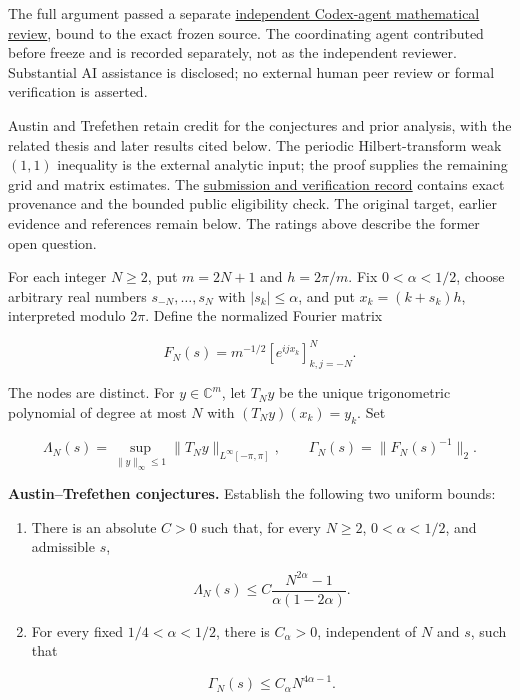 \documentclass[11pt,a4paper]{article}
\makeatletter
\renewcommand{\subsection}{\Needspace{4\baselineskip}\@startsection{subsection}{2}{0pt}{9pt plus 1pt minus 1pt}{3pt}{\sffamily\bfseries\normalsize\color{ink}}}
\makeatother
\begin{document}
The full argument passed a separate
\href{https://github.com/ajt60gaibb/OpenProblemsInNLA/blob/main/references/stepaniants-ie26-2026-09-12/verification/independent-review/IE-26-independent-review.md}{independent
Codex-agent mathematical review}, bound to the exact frozen source. The
coordinating agent contributed before freeze and is recorded separately,
not as the independent reviewer. Substantial AI assistance is disclosed;
no external human peer review or formal verification is asserted.

Austin and Trefethen retain credit for the conjectures and prior
analysis, with the related thesis and later results cited below. The
periodic Hilbert-transform weak \((1,1)\) inequality is the external
analytic input; the proof supplies the remaining grid and matrix
estimates. The
\href{https://github.com/ajt60gaibb/OpenProblemsInNLA/blob/main/references/stepaniants-ie26-2026-09-12/README.md}{submission
and verification record} contains exact provenance and the bounded
public eligibility check. The original target, earlier evidence and
references remain below. The ratings above describe the former open
question.

\newpage

\subsection{Statement}\label{statement}

For each integer \(N\ge2\), put \(m=2N+1\) and \(h=2\pi/m\). Fix
\(0<\alpha<1/2\), choose arbitrary real numbers \(s_{-N},\ldots,s_N\)
with \(|s_k|\le\alpha\), and put \(x_k=(k+s_k)h\), interpreted modulo
\(2\pi\). Define the normalized Fourier matrix

\[F_N(s)=m^{-1/2}[e^{ijx_k}]_{k,j=-N}^{N}.\]

The nodes are distinct. For \(y\in\mathbb C^m\), let \(T_Ny\) be the
unique trigonometric polynomial of degree at most \(N\) with
\((T_Ny)(x_k)=y_k\). Set

\[\Lambda_N(s)=\sup_{\|y\|_\infty\le1}\|T_Ny\|_{L^\infty[-\pi,\pi]},\qquad
\Gamma_N(s)=\|F_N(s)^{-1}\|_2.\]

\textbf{Austin--Trefethen conjectures.} Establish the following two
uniform bounds:

\begin{enumerate}
\def\labelenumi{\arabic{enumi}.}
\item
  There is an absolute \(C>0\) such that, for every \(N\ge2\),
  \(0<\alpha<1/2\), and admissible \(s\),

  \[\Lambda_N(s)\le C\frac{N^{2\alpha}-1}{\alpha(1-2\alpha)}.\]
\item
  For every fixed \(1/4<\alpha<1/2\), there is \(C_\alpha>0\),
  independent of \(N\) and \(s\), such that

  \[\Gamma_N(s)\le C_\alpha N^{4\alpha-1}.\]
\end{enumerate}
\end{document}
